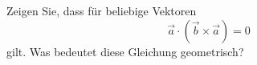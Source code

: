 \begin{ExerciseBlock}
Zeigen Sie, dass für beliebige Vektoren \[ \vec{a} \cdot \left( \vec{b} \times \vec{a} \right) = 0 \] gilt. Was bedeutet diese Gleichung geometrisch?

\end{ExerciseBlock}
